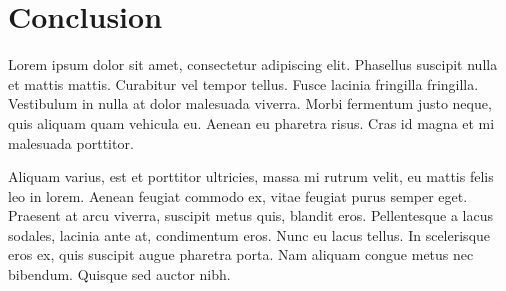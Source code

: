 \section{Conclusion}
Lorem ipsum dolor sit amet, consectetur adipiscing elit. Phasellus suscipit nulla et mattis mattis. Curabitur vel tempor tellus. 
Fusce lacinia fringilla fringilla. Vestibulum in nulla at dolor malesuada viverra. Morbi fermentum justo neque, quis aliquam quam vehicula eu. 
Aenean eu pharetra risus. Cras id magna et mi malesuada porttitor.

Aliquam varius, est et porttitor ultricies, massa mi rutrum velit, eu mattis felis leo in lorem. 
Aenean feugiat commodo ex, vitae feugiat purus semper eget. Praesent at arcu viverra, suscipit metus quis, blandit eros. 
Pellentesque a lacus sodales, lacinia ante at, condimentum eros. Nunc eu lacus tellus. In scelerisque eros ex, quis suscipit augue pharetra porta. 
Nam aliquam congue metus nec bibendum. Quisque sed auctor nibh.
